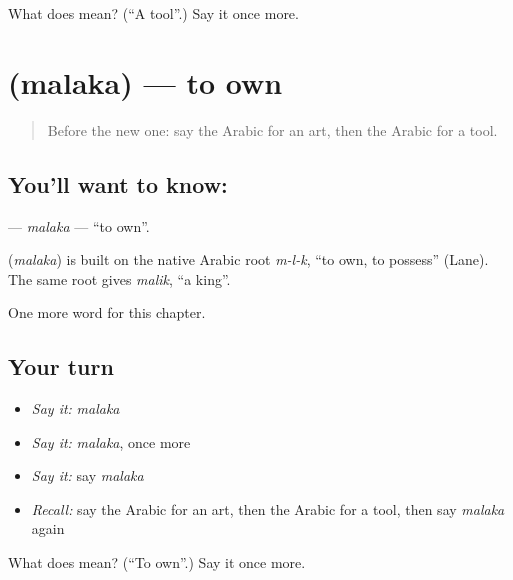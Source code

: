 \begin{tcolorbox}[breakable,colback=teal!4,colframe=teal!35!black,title={Before you move on}]
What does  mean? (\textquotedblleft{}A tool\textquotedblright{}.) Say it once more.
\end{tcolorbox}
\section[\texorpdfstring{\ar{ملك} (malaka)}{ملك (malaka)}]{ (malaka) — to own}

\label{lesson:AR-C110-malaka}



\begin{quote}
Before the new one: say the Arabic for an art, then the Arabic for a tool.
\end{quote}

\subsection*{You'll want to know: }
\textbf{} — \emph{malaka} — \textquotedblleft{}to own\textquotedblright{}.

\begin{cousinweb}
\textbf{} (\emph{malaka}) is built on the native Arabic root \emph{m-l-k}, \textquotedblleft{}to own, to possess\textquotedblright{} (Lane). The same root gives \emph{malik}, \textquotedblleft{}a king\textquotedblright{}.
\end{cousinweb}

\begin{grammarlens}[title={What you've built}]
One more word for this chapter.
\end{grammarlens}

\subsection*{Your turn}
\begin{itemize}
\raggedright
  \item \emph{Say it:} \emph{malaka}
  \item \emph{Say it:} \emph{malaka}, once more
  \item \emph{Say it:} say \emph{malaka}
  \item \emph{Recall:} say the Arabic for an art, then the Arabic for a tool, then say \emph{malaka} again
\end{itemize}

\begin{tcolorbox}[breakable,colback=teal!4,colframe=teal!35!black,title={Before you move on}]
What does  mean? (\textquotedblleft{}To own\textquotedblright{}.) Say it once more.
\end{tcolorbox}
